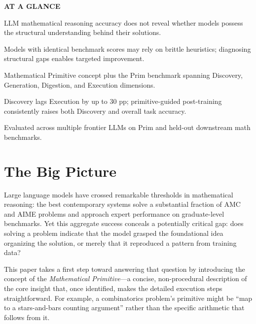 \documentclass[10pt,twocolumn]{article}
\begin{document}
\begin{mdframed}[backgroundcolor=boxgray,linecolor=rulered,linewidth=1pt,
    innerleftmargin=6pt,innerrightmargin=6pt,
    innertopmargin=6pt,innerbottommargin=6pt]
\textbf{\small AT A GLANCE}\par\vspace{4pt}
\begin{description}[leftmargin=0pt,labelsep=4pt,itemsep=2pt,parsep=0pt,
    font=\small\bfseries]
  \item[Problem:] LLM mathematical reasoning accuracy does not reveal whether models
    possess the structural understanding behind their solutions.
  \item[Why it matters:] Models with identical benchmark scores may rely on brittle
    heuristics; diagnosing structural gaps enables targeted improvement.
  \item[Method:] Mathematical Primitive concept plus the Prim benchmark spanning
    Discovery, Generation, Digestion, and Execution dimensions.
  \item[Result:] Discovery lags Execution by up to 30 pp; primitive-guided post-training
    consistently raises both Discovery and overall task accuracy.
  \item[Evidence:] Evaluated across multiple frontier LLMs on Prim and held-out
    downstream math benchmarks.
\end{description}
\end{mdframed}

\section{The Big Picture}

Large language models have crossed remarkable thresholds in mathematical reasoning: the best
contemporary systems solve a substantial fraction of AMC and AIME problems and approach expert
performance on graduate-level benchmarks. Yet this aggregate success conceals a potentially
critical gap: does solving a problem indicate that the model grasped the foundational idea
organizing the solution, or merely that it reproduced a pattern from training data?

This paper takes a first step toward answering that question by introducing the concept of
the \emph{Mathematical Primitive}---a concise, non-procedural description of the core insight
that, once identified, makes the detailed execution steps straightforward. For example,
a combinatorics problem's primitive might be ``map to a stars-and-bars counting argument''
rather than the specific arithmetic that follows from it.
\end{document}

